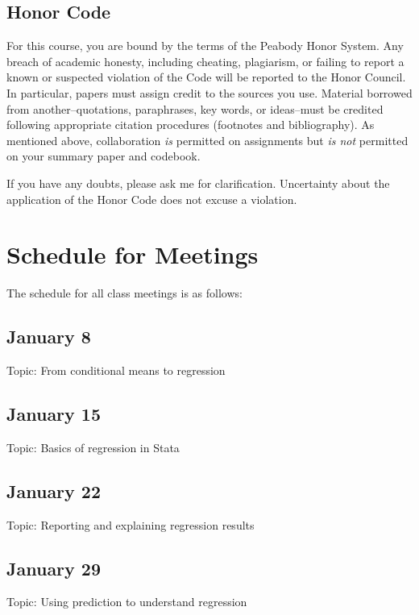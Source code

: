 \documentclass[12pt]{article}
\begin{document}
\subsection{Honor Code}
\label{sec:honor-code}

For this course, you are bound by the terms of the Peabody Honor
System. Any breach of academic honesty, including cheating,
plagiarism, or failing to report a known or suspected violation of the
Code will be reported to the Honor Council. In particular, papers must
assign credit to the sources you use. Material borrowed from
another--quotations, paraphrases, key words, or ideas--must be
credited following appropriate citation procedures (footnotes and
bibliography). As mentioned above, collaboration \textit{is} permitted
on assignments but \textit{is not} permitted on your summary paper and
codebook. 
 
If you have any doubts, please ask me for clarification. Uncertainty
about the application of the Honor Code does not excuse a violation.

\section{Schedule for Meetings}

The schedule for all class meetings is as follows:

 \subsection{January 8}

Topic: From conditional means to regression
 
\subsection{January 15}

Topic: Basics of regression in Stata

\subsection{January 22}

Topic: Reporting and explaining regression results

\subsection{January 29}

Topic: Using prediction to understand regression
\end{document}
